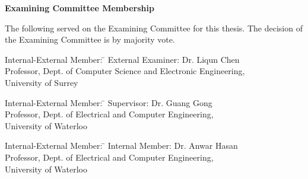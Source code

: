 \pagestyle{plain}
\setcounter{page}{2}

\cleardoublepage %
 
\begin{center}\textbf{Examining Committee Membership}\end{center}
  \noindent
The following served on the Examining Committee for this thesis. The decision of the Examining Committee is by majority vote.
  \bigskip
  
  \noindent
\begin{tabbing}
Internal-External Member: \=  \kill %
External Examiner: \>  Dr. Liqun Chen \\ 
\> Professor, Dept. of Computer Science and Electronic Engineering,\\
\> University of Surrey \\
\end{tabbing} 
  \bigskip
  
  \noindent
\begin{tabbing}
Internal-External Member: \=  \kill %
Supervisor: \> Dr. Guang Gong \\
\> Professor, Dept. of Electrical and Computer Engineering,\\
\> University of Waterloo \\

\end{tabbing}
  \bigskip
  
  \noindent
  \begin{tabbing}
Internal-External Member: \=  \kill %
Internal Member: \> Dr. Anwar Hasan\\
\> Professor, Dept. of Electrical and Computer Engineering,\\
\> University of Waterloo \\
\end{tabbing}
  \bigskip

